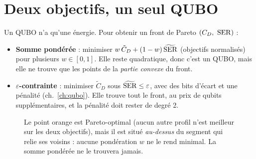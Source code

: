 \section{Deux objectifs, un seul QUBO}
Un QUBO n'a qu'une énergie. Pour obtenir un front de Pareto $(C_D,\ {\rm SER})$ :
\begin{itemize}
\item \textbf{Somme pondérée} : minimiser $w\,\tilde C_D+(1-w)\,\widetilde{\rm SER}$ (objectifs normalisés) pour plusieurs $w\in[0,1]$. Elle reste quadratique, donc c'est un QUBO, mais elle ne trouve que les points de la \emph{partie convexe} du front.
\item \textbf{$\varepsilon$-contrainte} : minimiser $\tilde C_D$ sous $\widetilde{\rm SER}\le\varepsilon$, avec des bits d'écart et une pénalité (ch.~\ref{ch:qubo}). Elle trouve tout le front, au prix de qubits supplémentaires, et la pénalité doit rester de degré 2.
\end{itemize}
\begin{figure}[htbp]
\centering
{}
\caption{Le point orange est Pareto-optimal (aucun autre profil n'est meilleur sur les deux objectifs), mais il est situé \emph{au-dessus} du segment qui relie ses voisins : aucune pondération $w$ ne le rend minimal. La somme pondérée ne le trouvera jamais.}\label{fig:pareto}
\end{figure}

